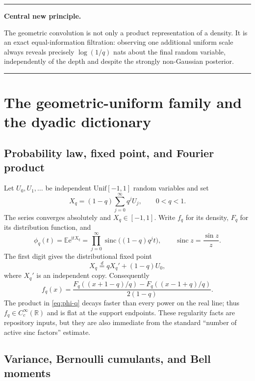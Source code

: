 \documentclass[11pt,oneside]{article}
\theoremstyle{definition}
\theoremstyle{remark}
\newcommand{\R}{\mathbb R}
\newcommand{\E}{\mathbb E}
\newcommand{\sinc}{\operatorname{sinc}}
\newcommand{\ii}{\mathrm i}
\newcommand{\e}{\mathrm e}
\newenvironment{resultbox}[1][Frontier result]{%
  \par\medskip\noindent
  \begin{center}\begin{minipage}{0.94\textwidth}
  \color{black}\hrule\vspace{0.55em}
  \textbf{#1.}\quad
}{%
  \vspace{0.55em}\hrule
  \end{minipage}\end{center}\medskip
}
\begin{document}
\begin{resultbox}[Central new principle]
The geometric convolution is not only a product representation of a density.  It
is an exact equal-information filtration: observing one additional uniform scale
always reveals precisely $\log(1/q)$ nats about the final random variable,
independently of the depth and despite the strongly non-Gaussian posterior.
\end{resultbox}

\section{The geometric-uniform family and the dyadic dictionary}
\label{sec:family}

\subsection{Probability law, fixed point, and Fourier product}

Let $U_0,U_1,\ldots$ be independent $\mathrm{Unif}[-1,1]$ random variables and set
\begin{equation}
 X_q=(1-q)\sum_{j=0}^{\infty}q^jU_j,
 \qquad 0<q<1.
 \label{eq:Xq}
\end{equation}
The series converges absolutely and $X_q\in[-1,1]$.  Write $f_q$ for its density,
$F_q$ for its distribution function, and
\begin{equation}
 \phi_q(t)=\E\e^{\ii tX_q}
 =\prod_{j=0}^{\infty}\sinc\bigl((1-q)q^jt\bigr),
 \qquad \sinc z=\frac{\sin z}{z}.
 \label{eq:phi-q}
\end{equation}
The first digit gives the distributional fixed point
\begin{equation}
 X_q\stackrel d=qX_q'+(1-q)U_0,
 \label{eq:fixedpoint}
\end{equation}
where $X_q'$ is an independent copy.  Consequently
\begin{equation}
 f_q(x)=\frac{F_q((x+1-q)/q)-F_q((x-1+q)/q)}{2(1-q)}.
 \label{eq:density-transfer}
\end{equation}
The product in \eqref{eq:phi-q} decays faster than every power on the real line;
thus $f_q\in C_c^\infty(\R)$ and is flat at the support endpoints.  These regularity
facts are repository inputs, but they are also immediate from the standard
``number of active sinc factors'' estimate.

\subsection{Variance, Bernoulli cumulants, and Bell moments}
\end{document}
